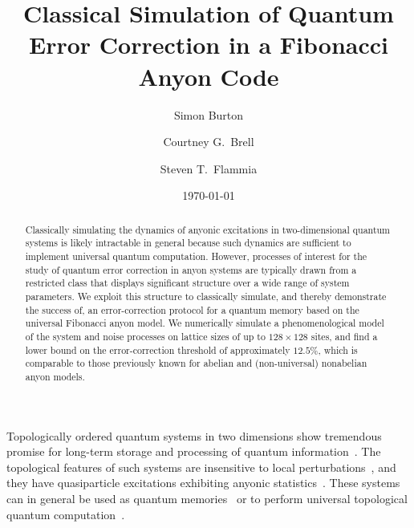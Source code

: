 \documentclass[aps, prl, letterpaper, twocolumn, superscriptaddress, notitlepage, 10pt]{revtex4}
\begin{document}
\title{Classical Simulation of Quantum Error Correction in a Fibonacci Anyon Code}

\author{Simon Burton}
\author{Courtney G.\ Brell}
\author{Steven T.\ Flammia}

\date{\today}

\begin{abstract}
Classically simulating the dynamics of anyonic excitations in two-dimensional quantum systems is likely intractable in general because such dynamics are sufficient to implement 
universal quantum computation. However, processes of interest for the study of quantum 
error correction in anyon systems are typically drawn from a restricted class that displays 
significant structure over a wide range of system parameters.
We exploit this structure to classically simulate, and thereby demonstrate the success of, an 
error-correction protocol for a quantum memory based on the universal Fibonacci anyon 
model.  We numerically simulate a phenomenological model of the system and noise 
processes on lattice sizes of up to 
$128\times128$ sites, and find a lower bound on the error-correction threshold of 
approximately $12.5\%$, which is comparable to those previously known for abelian and 
(non-universal) nonabelian anyon models.
\end{abstract}

\maketitle


Topologically ordered quantum systems in two dimensions show tremendous promise for 
long-term storage and processing of quantum information~\cite{Kitaev2003, Dennis2002, Nayak2008}. 
The topological features of such systems are insensitive to local 
perturbations~\cite{Bravyi2010, Bravyi2011a, Michalakis2013}, and they have quasiparticle excitations 
exhibiting anyonic statistics~\cite{Wilczek1990}. These systems can in general be used as 
quantum memories~\cite{Kitaev2003, Dennis2002} or to perform universal topological 
quantum computation~\cite{Freedman2002, Nayak2008}.
\end{document}
